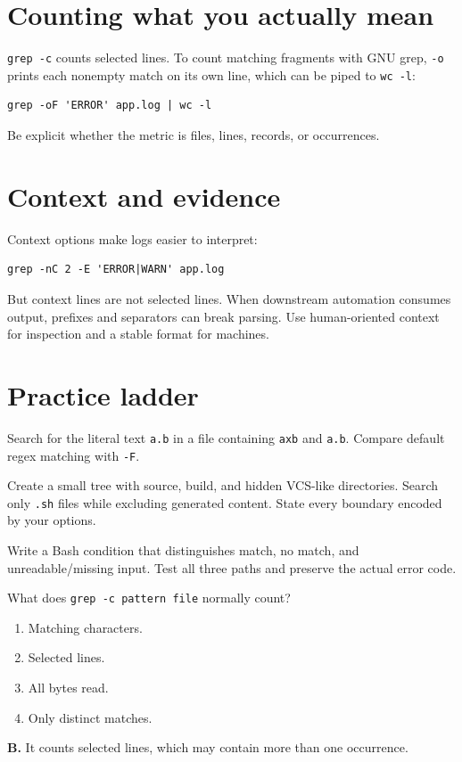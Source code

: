 \documentclass[11pt,oneside,openany]{book}
\newcommand{\fourchoices}[4]{%
  \begin{enumerate}[label=\Alph*),leftmargin=2em,itemsep=0.25em]
    \item #1
    \item #2
    \item #3
    \item #4
  \end{enumerate}}
\begin{document}
\section{Counting what you actually mean}
\texttt{grep -c} counts selected lines. To count matching fragments with GNU grep, \texttt{-o} prints each nonempty match on its own line, which can be piped to \texttt{wc -l}:
\begin{lstlisting}
grep -oF 'ERROR' app.log | wc -l
\end{lstlisting}
Be explicit whether the metric is files, lines, records, or occurrences.

\section{Context and evidence}
Context options make logs easier to interpret:
\begin{lstlisting}
grep -nC 2 -E 'ERROR|WARN' app.log
\end{lstlisting}
But context lines are not selected lines. When downstream automation consumes output, prefixes and separators can break parsing. Use human-oriented context for inspection and a stable format for machines.

\section{Practice ladder}
\begin{practicebox}[title={Easy -- fixed versus regex}]
Search for the literal text \texttt{a.b} in a file containing \texttt{axb} and \texttt{a.b}. Compare default regex matching with \texttt{-F}.
\end{practicebox}
\begin{practicebox}[title={Medium -- precise recursion}]
Create a small tree with source, build, and hidden VCS-like directories. Search only \texttt{.sh} files while excluding generated content. State every boundary encoded by your options.
\end{practicebox}
\begin{practicebox}[title={Hard -- status-safe condition}]
Write a Bash condition that distinguishes match, no match, and unreadable/missing input. Test all three paths and preserve the actual error code.
\end{practicebox}

\begin{questionbox}[title={Medium 10.1 -- Counting}]
What does \texttt{grep -c pattern file} normally count?
\fourchoices{Matching characters.}{Selected lines.}{All bytes read.}{Only distinct matches.}
\end{questionbox}
\begin{answerbox}
\textbf{B.} It counts selected lines, which may contain more than one occurrence.
\end{answerbox}
\end{document}
